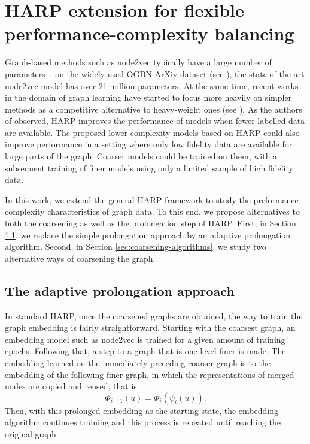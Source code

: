 \section{HARP extension for flexible performance-complexity balancing}

Graph-based methods such as node2vec typically have a large number of parameters -- on the widely used OGBN-ArXiv dataset (see \cite{hu_open_2021}), the state-of-the-art node2vec model has over 21 million parameters. At the same time, recent works in the domain of graph learning have started to focus more heavily on simpler methods as a competitive alternative to heavy-weight ones (see \cite{frasca_sign_2020,huang_combining_2020,salha_keep_2019,zhang_eigen-gnn_2021}). As the authors of \cite{chen_harp_2018} observed, HARP improves the performance of models when fewer labelled data are available. The proposed lower complexity models based on HARP could also improve performance in a setting where only low fidelity data are available for large parts of the graph. Coarser models could be trained on them, with a subsequent training of finer models using only a limited sample of high fidelity data.

In this work, we extend the general HARP framework to study the preformance-complexity characteristics of graph data. To this end, we propose alternatives to both the coarsening as well as the prolongation step of HARP. First, in Section \ref{sec:adaptive-prolongation}, we replace the simple prolongation approach by an adaptive prolongation algorithm. Second, in Section \ref{sec:coarsening-algorithms}, we study two alternative ways of coarsening the graph.

\subsection{The adaptive prolongation approach}\label{sec:adaptive-prolongation}

In standard HARP, once the coarsened graphs are obtained, the way to train the graph embedding is fairly straightforward. Starting with the coarsest graph, an embedding model such as node2vec is trained for a given amount of training epochs. Following that, a step to a graph that is one level finer is made. The embedding learned on the immediately preceding coarser graph is  to the embedding of the following finer graph, in which the representations of merged nodes are copied and reused, that is
\[ \Phi_{i - 1} \left( u \right) = \Phi_i \left( \psi_i \left( u \right) \right)\text{.} \]
 Then, with this prolonged embedding as the starting state, the embedding algorithm continues training and this process is repeated until reaching the original graph.

